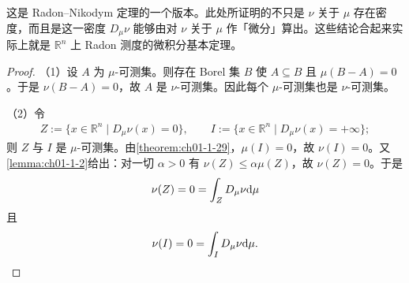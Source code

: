 \documentclass[../../main.tex]{subfiles}%
\begin{document}
\begin{remark}\label{remark:ch01-thm-1-30-微积分}
这是 Radon--Nikodym 定理的一个版本。此处所证明的不只是 $\nu$ 关于 $\mu$ 存在密度，而且是这一密度 $D_{\mu}\nu$ 能够由对 $\nu$ 关于 $\mu$ 作「微分」算出。这些结论合起来实际上就是 $\mathbb{R}^n$ 上 Radon 测度的微积分基本定理。
\end{remark}

\begin{proof}
（1）设 $A$ 为 $\mu$-可测集。则存在 Borel 集 $B$ 使 $A\subseteq B$ 且 $\mu(B-A)=0$。于是 $\nu(B-A)=0$，故 $A$ 是 $\nu$-可测集。因此每个 $\mu$-可测集也是 $\nu$-可测集。

（2）令
\begin{align*}
Z:=\{x\in\mathbb{R}^n\mid D_{\mu}\nu(x)=0\},\qquad I:=\{x\in\mathbb{R}^n\mid D_{\mu}\nu(x)=+\infty\};
\end{align*}
则 $Z$ 与 $I$ 是 $\mu$-可测集。由\cref{theorem:ch01-1-29}，$\mu(I)=0$，故 $\nu(I)=0$。又\cref{lemma:ch01-1-2}给出：对一切 $\alpha>0$ 有 $\nu(Z)\leqslant\alpha\mu(Z)$，故 $\nu(Z)=0$。于是%
\begin{align*}
\nu(Z)=0=\int_Z D_{\mu}\nu\mathrm{d}\mu
\end{align*}
且
\begin{align*}
\nu(I)=0=\int_I D_{\mu}\nu\mathrm{d}\mu .
\end{align*}


\end{proof}
\end{document}
